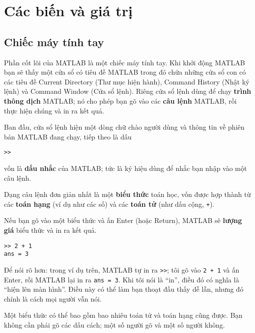 \documentclass[12pt]{book}
\begin{document}

\tableofcontents

\mainmatter

\chapter{Các biến và giá trị}

\section{Chiếc máy tính tay}
\label{calc}

Phần cốt lõi của MATLAB là một chiếc máy tính tay. Khi khởi động MATLAB
bạn sẽ thấy một cửa sổ có tiêu đề {\sf MATLAB} trong đó chứa những cửa sổ
con có các tiêu đề {\sf Current Directory} (Thư mục hiện hành), {\sf Command 
History} (Nhật ký lệnh) và {\sf Command Window} (Cửa sổ lệnh).
Riêng cửa sổ lệnh dùng để chạy {\bf trình thông dịch} MATLAB; nó cho phép bạn gõ
vào các {\bf câu lệnh} MATLAB, rồi thực hiện chúng và in ra kết quả.

Ban đầu, cửa sổ lệnh hiện một dòng chữ chào người dùng và thông tin về phiên
bản MATLAB đang chạy, tiếp theo là dấu 

\begin{verbatim}
>>
\end{verbatim}

\noindent vốn là {\bf dấu nhắc} của MATLAB; tức là ký hiệu dùng để nhắc bạn nhập vào một
câu lệnh.

Dạng câu lệnh đơn giản nhất là một {\bf biểu thức} toán học, vốn được 
hợp thành từ các {\bf toán hạng} (ví dụ như các số) và các 
{\bf toán tử} (như dấu cộng, {\tt +}).

Nếu bạn gõ vào một biểu thức và ấn Enter (hoặc Return), MATLAB sẽ 
{\bf lượng giá} biểu thức và in ra kết quả.

\begin{verbatim}
>> 2 + 1
ans = 3
\end{verbatim}

Để nói rõ hơn: trong ví dụ trên, MATLAB tự in ra \verb#>>#; tôi  
gõ vào {\tt 2 + 1} và ấn Enter, rồi MATLAB lại in ra {\tt ans = 3}.
Khi tôi nói là ``in'', điều đó có nghĩa là ``hiện lên màn hình''. Điều này
có thể làm bạn thoạt đầu thấy dễ lẫn, nhưng đó chính là cách mọi người
vẫn nói.

Một biểu thức có thể bao gồm bao nhiêu toán tử và toán hạng cũng được.
Bạn không cần phải gõ các dấu cách; một số người gõ và một số người không.
\end{document}
